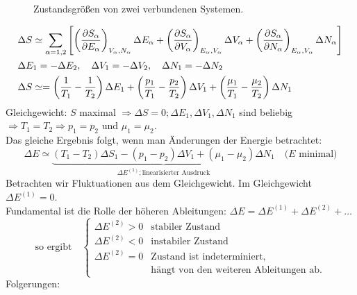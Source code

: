 \begin{figure}[H]
        \centering
        \def\svgwidth{0.35\textwidth}
        
        \caption{Zustandsgrößen von zwei verbundenen Systemen.}
        \label{img:2Systems}
\end{figure}

\begin{equation}
    \begin{split}
        & \Delta S \simeq \sum_{\alpha = 1, 2} \left[ \left( \frac{\partial S_\alpha}{\partial E_\alpha} \right)_{V_\alpha, N_\alpha} \Delta E_\alpha
        + \left( \frac{\partial S_\alpha}{\partial V_\alpha} \right)_{E_\alpha, V_\alpha} \Delta V_\alpha + \left( \frac{\partial S_\alpha}{\partial N_\alpha} \right)_{E_\alpha, V_\alpha} \Delta N_\alpha \right] \\
        & \Delta E_1 = - \Delta E_2, \quad \Delta V_1 = - \Delta V_2, \quad \Delta N_1 = - \Delta N_2 \\
        & \Delta S \simeq = \left( \frac{1}{T_1} - \frac{1}{T_2} \right) \Delta E_1 + \left( \frac{p_1}{T_1}
        - \frac{p_2}{T_2} \right) \Delta V_1 + \left( \frac{\mu_1}{T_1} - \frac{\mu_2}{T_2} \right) \Delta N_1
    \end{split}
\end{equation}
Gleichgewicht: $S$ maximal $\Rightarrow \Delta S = 0; \Delta E_1, \Delta V_1, \Delta N_1$ sind beliebig
$\Rightarrow T_1 = T_2 \Rightarrow p_1 = p_2$ und $\mu_1 = \mu_2$. \\
Das gleiche Ergebnis folgt, wenn man Änderungen der Energie betrachtet:
\begin{equation}
    \Delta E \simeq \underbrace{\left( T_1 - T_2 \right)  \Delta S_1 - \left( p_1 - p_2 \right) \Delta V_1 + \left( \mu_1 - \mu_2 \right) \Delta N_1}_{\Delta E^{(1)}; \text{linearisierter Ausdruck}} \quad \text{($E$ minimal)}
\end{equation}
Betrachten wir Fluktuationen aus dem Gleichgewicht. Im Gleichgewicht $\Delta E^{(1)} = 0$. \\
Fundamental ist die Rolle der höheren Ableitungen: $\Delta E = \Delta E^{(1)} + \Delta E^{(2)} + \ldots$
\begin{equation}
    \text{so ergibt} \quad
    \begin{cases}
        \Delta E^{(2)} > 0 & \text{stabiler Zustand} \\
        \Delta E^{(2)} < 0 & \text{instabiler Zustand} \\
        \Delta E^{(2)} = 0 & \text{Zustand ist indeterminiert,} \\
        & \text{hängt von den weiteren Ableitungen ab.}
    \end{cases}
\end{equation}
Folgerungen:

